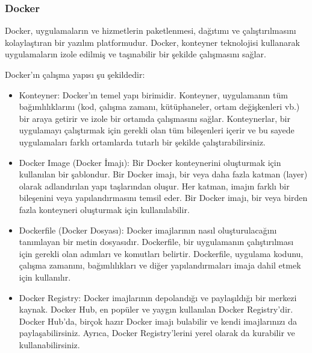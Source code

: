 \subsubsection{Docker}
Docker, uygulamaların ve hizmetlerin paketlenmesi, dağıtımı ve çalıştırılmasını kolaylaştıran bir yazılım platformudur. Docker, konteyner teknolojisi kullanarak uygulamaların izole edilmiş ve taşınabilir bir şekilde çalışmasını sağlar.

Docker'ın çalışma yapısı şu şekildedir:
\begin{itemize}
\item Konteyner: Docker'ın temel yapı birimidir. Konteyner, uygulamanın tüm bağımlılıklarını (kod, çalışma zamanı, kütüphaneler, ortam değişkenleri vb.) bir araya getirir ve izole bir ortamda çalışmasını sağlar. Konteynerlar, bir uygulamayı çalıştırmak için gerekli olan tüm bileşenleri içerir ve bu sayede uygulamaları farklı ortamlarda tutarlı bir şekilde çalıştırabilirsiniz.

\item Docker Image (Docker İmajı): Bir Docker konteynerini oluşturmak için kullanılan bir şablondur. Bir Docker imajı, bir veya daha fazla katman (layer) olarak adlandırılan yapı taşlarından oluşur. Her katman, imajın farklı bir bileşenini veya yapılandırmasını temsil eder. Bir Docker imajı, bir veya birden fazla konteyneri oluşturmak için kullanılabilir.

\item Dockerfile (Docker Dosyası): Docker imajlarının nasıl oluşturulacağını tanımlayan bir metin dosyasıdır. Dockerfile, bir uygulamanın çalıştırılması için gerekli olan adımları ve komutları belirtir. Dockerfile, uygulama kodunu, çalışma zamanını, bağımlılıkları ve diğer yapılandırmaları imaja dahil etmek için kullanılır.

\item Docker Registry: Docker imajlarının depolandığı ve paylaşıldığı bir merkezi kaynak. Docker Hub, en popüler ve yaygın kullanılan Docker Registry'dir. Docker Hub'da, birçok hazır Docker imajı bulabilir ve kendi imajlarınızı da paylaşabilirsiniz. Ayrıca, Docker Registry'lerini yerel olarak da kurabilir ve kullanabilirsiniz.
\end{itemize}

